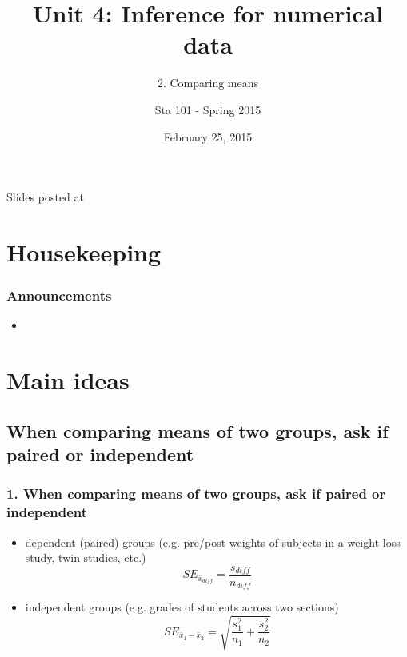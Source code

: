\documentclass[11pt,containsverbatim,handout,xcolor=xelatex,dvipsnames,table]{beamer}
\title{Unit 4: Inference for numerical data}
\subtitle{2. Comparing means}
\author{Sta 101 - Spring 2015}
\date{February 25, 2015}
\institute{Duke University, Department of Statistical Science}
\begin{document}


\begin{frame}[plain]

\titlepage
\vfill
{\scriptsize {} \hfill Slides posted at  \webLink{\CourseSite}{\CourseSite}}
\addtocounter{framenumber}{-1} 

\end{frame}


\section{Housekeeping}


\begin{frame}
\frametitle{Announcements}

\begin{itemize}

\item 

\end{itemize}

\end{frame}


\section{Main ideas}


\subsection{When comparing means of two groups, ask if paired or independent}
\label{mi1}


\begin{frame}
\frametitle{1. When comparing means of two groups, ask if paired or independent}

\begin{itemize}

\item dependent (paired) groups (e.g. pre/post weights of subjects in a weight loss study, twin studies, etc.)
\[ SE_{\bar{x}_{diff}} = \frac{s_{diff}}{n_{diff}} \]

\item independent groups (e.g. grades of students across two sections)
\[ SE_{\bar{x}_1 - \bar{x}_2} = \sqrt{ \frac{s_1^2}{n_1} + \frac{s_2^2}{n_2} } \]

\end{itemize}

\end{frame}
\end{document}
